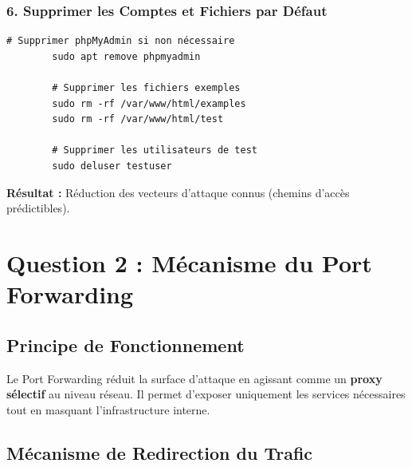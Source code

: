 \documentclass[12pt,a4paper,openany]{report}
\begin{document}
	\subsubsection{6. Supprimer les Comptes et Fichiers par Défaut}
	\begin{lstlisting}[caption=Nettoyage post-installation]
		# Supprimer phpMyAdmin si non nécessaire
		sudo apt remove phpmyadmin
		
		# Supprimer les fichiers exemples
		sudo rm -rf /var/www/html/examples
		sudo rm -rf /var/www/html/test
		
		# Supprimer les utilisateurs de test
		sudo deluser testuser
	\end{lstlisting}
	\textbf{Résultat :} Réduction des vecteurs d'attaque connus (chemins d'accès prédictibles).
	
	\section{Question 2 : Mécanisme du Port Forwarding}
	
	\subsection{Principe de Fonctionnement}
	Le Port Forwarding réduit la surface d'attaque en agissant comme un \textbf{proxy sélectif} au niveau réseau. Il permet d'exposer uniquement les services nécessaires tout en masquant l'infrastructure interne.
	
	\subsection{Mécanisme de Redirection du Trafic}
	
\end{document}
